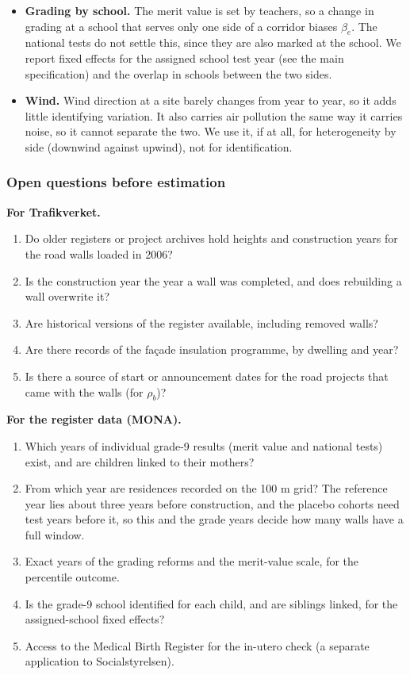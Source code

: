 \documentclass[11pt]{article}
\begin{document}
\begin{itemize}
\item \textbf{Grading by school.} The merit value is set by teachers, so a change in grading at a school that serves only one side of a corridor biases \(\beta_e\). The national tests do not settle this, since they are also marked at the school. We report fixed effects for the assigned school \texttimes{} test year (see the main specification) and the overlap in schools between the two sides.
\item \textbf{Wind.} Wind direction at a site barely changes from year to year, so it adds little identifying variation. It also carries air pollution the same way it carries noise, so it cannot separate the two. We use it, if at all, for heterogeneity by side (downwind against upwind), not for identification.
\end{itemize}

\subsubsection{Open questions before estimation}

\textbf{For Trafikverket.}
\begin{enumerate}
\item Do older registers or project archives hold heights and construction years for the road walls loaded in 2006?
\item Is the construction year the year a wall was completed, and does rebuilding a wall overwrite it?
\item Are historical versions of the register available, including removed walls?
\item Are there records of the façade insulation programme, by dwelling and year?
\item Is there a source of start or announcement dates for the road projects that came with the walls (for \(\rho_b\))?
\end{enumerate}

\textbf{For the register data (MONA).}
\begin{enumerate}
\item Which years of individual grade-9 results (merit value and national tests) exist, and are children linked to their mothers?
\item From which year are residences recorded on the 100 m grid? The reference year lies about three years before construction, and the placebo cohorts need test years before it, so this and the grade years decide how many walls have a full window.
\item Exact years of the grading reforms and the merit-value scale, for the percentile outcome.
\item Is the grade-9 school identified for each child, and are siblings linked, for the assigned-school fixed effects?
\item Access to the Medical Birth Register for the in-utero check (a separate application to Socialstyrelsen).
\end{enumerate}
\end{document}
